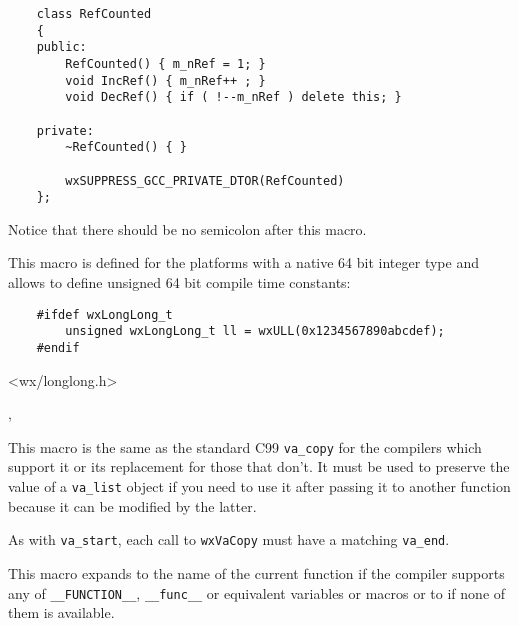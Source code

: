 \begin{verbatim}
    class RefCounted
    {
    public:
        RefCounted() { m_nRef = 1; }
        void IncRef() { m_nRef++ ; }
        void DecRef() { if ( !--m_nRef ) delete this; }

    private:
        ~RefCounted() { }

        wxSUPPRESS_GCC_PRIVATE_DTOR(RefCounted)
    };
\end{verbatim}

Notice that there should be no semicolon after this macro.


\label{wxull}


This macro is defined for the platforms with a native 64 bit integer type and
allows to define unsigned 64 bit compile time constants:

\begin{verbatim}
    #ifdef wxLongLong_t
        unsigned wxLongLong_t ll = wxULL(0x1234567890abcdef);
    #endif
\end{verbatim}


<wx/longlong.h>


, 


\label{wxvacopy}


This macro is the same as the standard C99 \texttt{va\_copy} for the compilers
which support it or its replacement for those that don't. It must be used to
preserve the value of a \texttt{va\_list} object if you need to use it after
passing it to another function because it can be modified by the latter.

As with \texttt{va\_start}, each call to \texttt{wxVaCopy} must have a matching
\texttt{va\_end}.



\label{wxfunction}


This macro expands to the name of the current function if the compiler supports
any of \texttt{\_\_FUNCTION\_\_}, \texttt{\_\_func\_\_} or equivalent variables
or macros or to \NULL if none of them is available.



